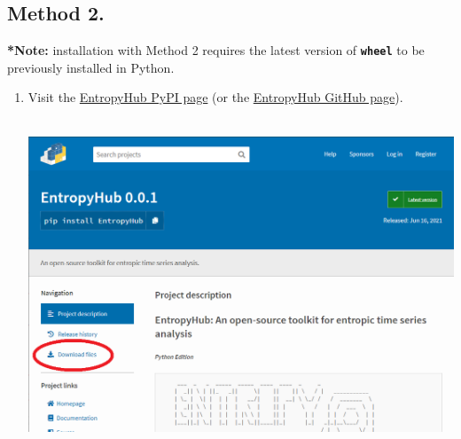 \documentclass[12pt, a4paper, titlepage, openany]{book}
\begin{document}
\subsection*{\normalsize Method 2.}
\noindent \textbf{*Note:} installation with Method 2 requires the latest version of \textbf{\texttt{wheel}} to be previously installed in Python.
\begin{enumerate}
\item	Visit the \href{https://pypi.org/project/EntropyHub/}{EntropyHub PyPI page} 
 (or the \href{https://github.com/MattWillFlood/EntropyHub/tree/main/EntropyHub\%20-\%20Python}{EntropyHub GitHub page}). \\ \ \\
\begin{minipage}[h]{\linewidth}
          \centering
          \includegraphics[scale=.5]{pyscreen1.png}
          \medskip
\end{minipage}
 

\end{enumerate}
\end{document}
